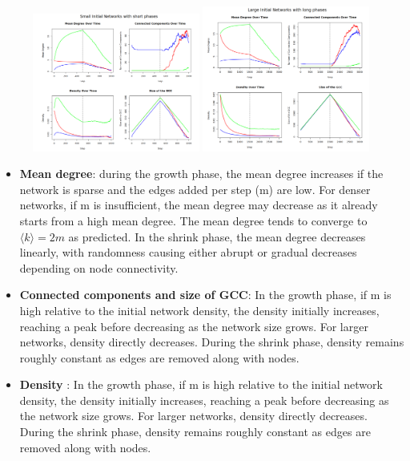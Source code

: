 \begin{figure}[h!]
    \centering
    \includegraphics[width=0.49\textwidth]{images/magnitudes_small_ER.png}
    \hfill
    \includegraphics[width=0.49\textwidth]{images/magnitudes_large_ER.png}
\end{figure}
\begin{itemize}
    \item \textbf{Mean degree}: during the growth phase, the mean degree increases if the network is sparse and the edges added per step (m) are low. For denser networks, if m is insufficient, the mean degree may decrease as it already starts from a high mean degree. The mean degree tends to converge to \( \langle k \rangle = 2m \) as predicted. In the shrink phase, the mean degree decreases linearly, with randomness causing either abrupt or gradual decreases depending on node connectivity.
    \item \textbf{Connected components and size of GCC}: In the growth phase, if m is high relative to the initial network density, the density initially increases, reaching a peak before decreasing as the network size grows. For larger networks, density directly decreases. During the shrink phase, density remains roughly constant as edges are removed along with nodes.
    \item \textbf{Density} : In the growth phase, if m is high relative to the initial network density, the density initially increases, reaching a peak before decreasing as the network size grows. For larger networks, density directly decreases. During the shrink phase, density remains roughly constant as edges are removed along with nodes.

    
\end{itemize}

